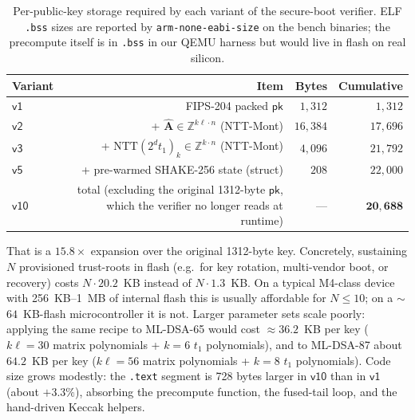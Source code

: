 \documentclass[11pt,a4paper]{article}
\newcommand{\NTT}{\mathrm{NTT}}
\begin{document}
\begin{table}[h]
\centering
\caption{Per-public-key storage required by each variant of the
secure-boot verifier. ELF \texttt{.bss} sizes are reported by
\texttt{arm-none-eabi-size} on the bench binaries; the precompute
itself is in \texttt{.bss} in our QEMU harness but would live in
flash on real silicon.}
\label{tab:pk-footprint}
\begin{tabular}{l r r r}
\toprule
Variant          & Item                                       & Bytes & Cumulative \\
\midrule
$\textsf{v1}$    & FIPS-204 packed $\textsf{pk}$              & $1{,}312$   & $1{,}312$ \\
$\textsf{v2}$    & + $\hat{\mathbf{A}} \in \mathbb{Z}^{k\ell \cdot n}$ (NTT-Mont)
                                                              & $16{,}384$  & $17{,}696$ \\
$\textsf{v3}$    & + $\NTT(2^d t_1)_k \in \mathbb{Z}^{k \cdot n}$ (NTT-Mont)
                                                              & $4{,}096$   & $21{,}792$ \\
$\textsf{v5}$    & + pre-warmed SHAKE-256 state (struct)      & $208$       & $22{,}000$ \\
\midrule
$\textsf{v10}$  & total (excluding the original 1312-byte $\textsf{pk}$, which the verifier no longer reads at runtime)
                                                              & ---          & $\mathbf{20{,}688}$ \\
\bottomrule
\end{tabular}
\end{table}

That is a $\mathbf{15.8\times}$ expansion over the original 1312-byte
key. Concretely, sustaining $N$ provisioned trust-roots in flash
(e.g.\ for key rotation, multi-vendor boot, or recovery) costs
$N \cdot 20.2$~KB instead of $N \cdot 1.3$~KB. On a typical
M4-class device with 256~KB--1~MB of internal flash this is usually
affordable for $N \le 10$; on a $\sim$$64$~KB-flash microcontroller
it is not. Larger parameter sets scale poorly: applying the same
recipe to ML-DSA-65 would cost $\approx 36.2$~KB per key
($k\ell = 30$ matrix polynomials + $k = 6$ $t_1$ polynomials), and
to ML-DSA-87 about $\mathbf{64.2}$~KB per key ($k\ell = 56$ matrix
polynomials + $k = 8$ $t_1$ polynomials). Code size grows modestly:
the \texttt{.text} segment is 728 bytes larger in $\textsf{v10}$
than in $\textsf{v1}$ (about $+3.3\%$), absorbing the precompute
function, the fused-tail loop, and the hand-driven Keccak helpers.
\end{document}
